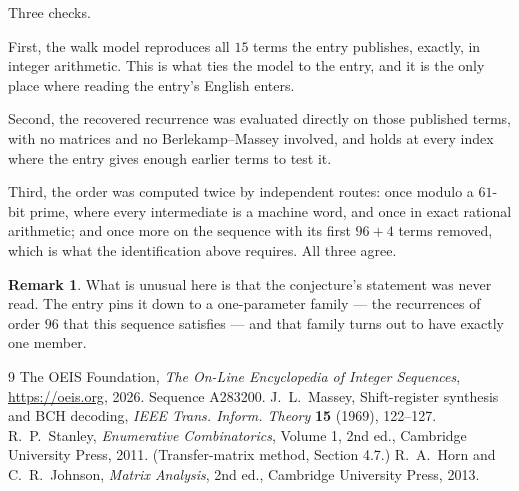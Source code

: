 \documentclass[11pt,a4paper]{article}
\theoremstyle{plain}
\theoremstyle{definition}
\newtheorem{remark}[theorem]{Remark}
\begin{document}
Three checks.

First, the walk model reproduces all $15$ terms the entry publishes, exactly, in integer
arithmetic. This is what ties the model to the entry, and it is the only place where reading
the entry's English enters.

Second, the recovered recurrence was evaluated directly on those published terms, with no
matrices and no Berlekamp--Massey involved, and holds at every index where the entry gives
enough earlier terms to test it.

Third, the order was computed twice by independent routes: once modulo a $61$-bit prime, where
every intermediate is a machine word, and once in exact rational arithmetic; and once more on
the sequence with its first $96+4$ terms removed, which is what the identification above
requires. All three agree.

\begin{remark}
What is unusual here is that the conjecture's statement was never read. The entry pins it down
to a one-parameter family --- the recurrences of order $96$ that this sequence satisfies
--- and that family turns out to have exactly one member.
\end{remark}

\begin{thebibliography}{9}
 The OEIS Foundation, \emph{The On-Line Encyclopedia of Integer
Sequences}, \url{https://oeis.org}, 2026. Sequence A283200.
 J.~L.~Massey, Shift-register synthesis and BCH decoding, \emph{IEEE
Trans. Inform. Theory} \textbf{15} (1969), 122--127.
 R.~P.~Stanley, \emph{Enumerative Combinatorics}, Volume 1, 2nd ed.,
Cambridge University Press, 2011. (Transfer-matrix method, Section 4.7.)
 R.~A.~Horn and C.~R.~Johnson, \emph{Matrix Analysis}, 2nd ed., Cambridge
University Press, 2013.
\end{thebibliography}
\end{document}
